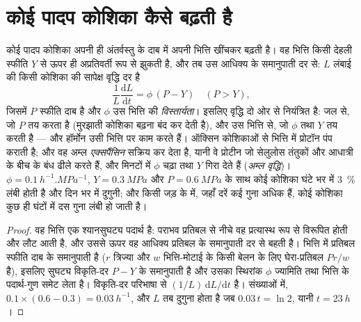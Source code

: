 \section{कोई पादप कोशिका कैसे बढ़ती है}

\begin{theorem}[लॉकहार्ट समीकरण]\label{thm:b2:plant-meristems:lockhart}
कोई पादप कोशिका अपनी ही अंतर्वस्तु के दाब में अपनी भित्ति खींचकर बढ़ती
है। वह भित्ति किसी देहली स्फीति $Y$ से ऊपर ही अप्रतिवर्ती रूप से झुकती
है, और तब उस आधिक्य के समानुपाती दर से: $L$ लंबाई की किसी कोशिका की
सापेक्ष वृद्धि दर है
\[
\frac{1}{L}\frac{\mathrm{d}L}{\mathrm{d}t} = \phi\,(P - Y) \quad (P > Y),
\]
जिसमें $P$ स्फीति दाब है और $\phi$ उस भित्ति की
\emph{विस्तार्यता}। इसलिए वृद्धि दो ओर से नियंत्रित है:
जल से, जो $P$ तय करता है (मुरझाती कोशिका बढ़ना बंद कर देती है), और उस
भित्ति से, जो $\phi$ तथा $Y$ तय करती है --- और हॉर्मोन उसी भित्ति पर
काम करते हैं। ऑक्सिन कोशिकाओं से भित्ति में प्रोटॉन पंप कराती है; और वह
अम्ल \emph{एक्सपैंसिन} सक्रिय कर देता है, यानी वे प्रोटीन जो सेलुलोस
तंतुकों और आधात्री के बीच के बंध ढीले करते हैं, और मिनटों में $\phi$
चढ़ा तथा $Y$ गिरा देते हैं (\emph{अम्ल वृद्धि})। $\phi =
\qty{0.1}{h^{-1}.MPa^{-1}}$, $Y = \qty{0.3}{MPa}$ और $P =
\qty{0.6}{MPa}$ के साथ कोई कोशिका घंटे भर में \qty{3}{\%} लंबी होती है
और दिन भर में दुगुनी; और किसी जड़ के  में, जहाँ दरें कई
गुना अधिक हैं, कोई कोशिका कुछ ही घंटों में दस गुना लंबी हो जाती है।
\end{theorem}
\begin{proof}
वह भित्ति एक श्यानसुघट्य पदार्थ है: पराभव प्रतिबल से नीचे वह
प्रत्यास्थ रूप से विरूपित होती और लौट आती है, और उससे ऊपर वह आधिक्य
प्रतिबल के समानुपाती दर से बहती है। भित्ति में प्रतिबल स्फीति दाब के
समानुपाती है ($r$ त्रिज्या और $w$ भित्ति-मोटाई के किसी बेलन के लिए
घेरा-प्रतिबल $Pr/w$ है), इसलिए सुघट्य विकृति-दर $P - Y$ के समानुपाती है
और उसका स्थिरांक $\phi$ ज्यामिति तथा भित्ति के पदार्थ-गुण समेट लेता है।
विकृति-दर परिभाषा से $(1/L)\,\mathrm{d}L/\mathrm{d}t$ है। संख्याओं में,
$0.1\times(0.6 - 0.3) = \qty{0.03}{h^{-1}}$, और $L$ तब दुगुना होता है जब
$0.03\,t = \ln 2$, यानी $t = \qty{23}{h}$।
\end{proof}

